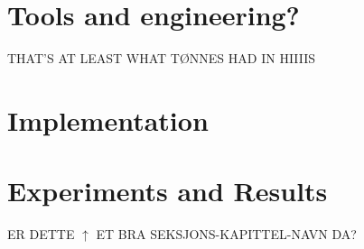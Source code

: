 \documentclass[a4paper, english]{article}
\begin{document}
	
	\section{Tools and engineering?}
	THAT'S AT LEAST WHAT TØNNES HAD IN HIIIIS

	\section{Implementation}
	
	
	
	\section{Experiments and Results}
	ER DETTE $\uparrow$ ET BRA SEKSJONS-KAPITTEL-NAVN DA?






	\newpage
	\printbibliography
\end{document}
